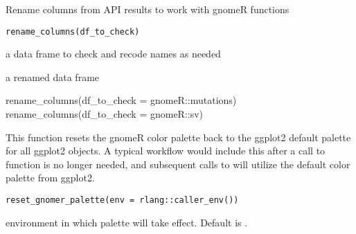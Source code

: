 \documentclass[a4paper]{book}
\begin{document}
%
\begin{Description}\relax
Rename columns from API results to work with gnomeR functions
\end{Description}
%
\begin{Usage}
\begin{verbatim}
rename_columns(df_to_check)
\end{verbatim}
\end{Usage}
%
\begin{Arguments}
\begin{ldescription}
\item[\code{df\_to\_check}] a data frame to check and recode names as needed
\end{ldescription}
\end{Arguments}
%
\begin{Value}
a renamed data frame
\end{Value}
%
\begin{Examples}
\begin{ExampleCode}

rename_columns(df_to_check = gnomeR::mutations)
rename_columns(df_to_check = gnomeR::sv)

\end{ExampleCode}
\end{Examples}
%
\begin{Description}\relax
This function resets the gnomeR color palette back to the ggplot2 default palette for all
ggplot2 objects. A typical workflow would include this after a call to 
function is no longer needed,
and subsequent calls to  will utilize the default color palette from ggplot2.
\end{Description}
%
\begin{Usage}
\begin{verbatim}
reset_gnomer_palette(env = rlang::caller_env())
\end{verbatim}
\end{Usage}
%
\begin{Arguments}
\begin{ldescription}
\item[\code{env}] environment in which palette will take effect. Default is .
\end{ldescription}
\end{Arguments}
\end{document}
